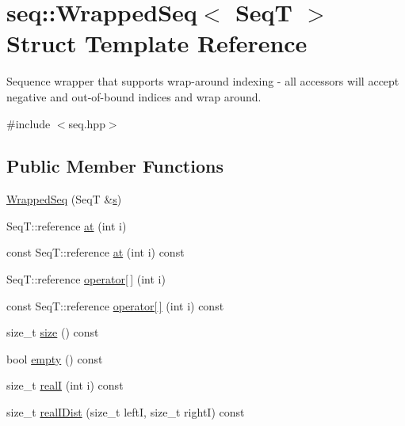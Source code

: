 \hypertarget{structseq_1_1_wrapped_seq}{\section{seq\-:\-:Wrapped\-Seq$<$ Seq\-T $>$ Struct Template Reference}
\label{structseq_1_1_wrapped_seq}
}


Sequence wrapper that supports wrap-\/around indexing -\/ all accessors will accept negative and out-\/of-\/bound indices and wrap around.  




{\ttfamily \#include $<$seq.\-hpp$>$}

\subsection*{Public Member Functions}
\begin{DoxyCompactItemize}
\item 
\hyperlink{structseq_1_1_wrapped_seq_aeb07ecb3ae54bc7460405d3f95098bcd}{Wrapped\-Seq} (Seq\-T \&\hyperlink{structseq_1_1_wrapped_seq_a838d548016ce08b745cb29dbee635437}{s})
\item 
Seq\-T\-::reference \hyperlink{structseq_1_1_wrapped_seq_a2267a0d93467dc4db6b64a9914a0e265}{at} (int i)
\item 
const Seq\-T\-::reference \hyperlink{structseq_1_1_wrapped_seq_a09864746e7dfb9e0d1ef6ebc59a9a4e8}{at} (int i) const 
\item 
Seq\-T\-::reference \hyperlink{structseq_1_1_wrapped_seq_a7ffd5783fc6d50fad65f89e6e2cc8489}{operator\mbox{[}$\,$\mbox{]}} (int i)
\item 
const Seq\-T\-::reference \hyperlink{structseq_1_1_wrapped_seq_a562c969d3a8f3c8aeede89d25747ba64}{operator\mbox{[}$\,$\mbox{]}} (int i) const 
\item 
size\-\_\-t \hyperlink{structseq_1_1_wrapped_seq_ab892f134a58400cc8a8ae32a2dabb7c4}{size} () const 
\item 
bool \hyperlink{structseq_1_1_wrapped_seq_abef397e7335e8705520777284326fe23}{empty} () const 
\item 
size\-\_\-t \hyperlink{structseq_1_1_wrapped_seq_a0259bb6a1a44a68e4dbda5b37750f503}{real\-I} (int i) const 
\item 
size\-\_\-t \hyperlink{structseq_1_1_wrapped_seq_a2b929ec2f56c92a9b2269f1853e4cd10}{real\-I\-Dist} (size\-\_\-t left\-I, size\-\_\-t right\-I) const 
\end{DoxyCompactItemize}
